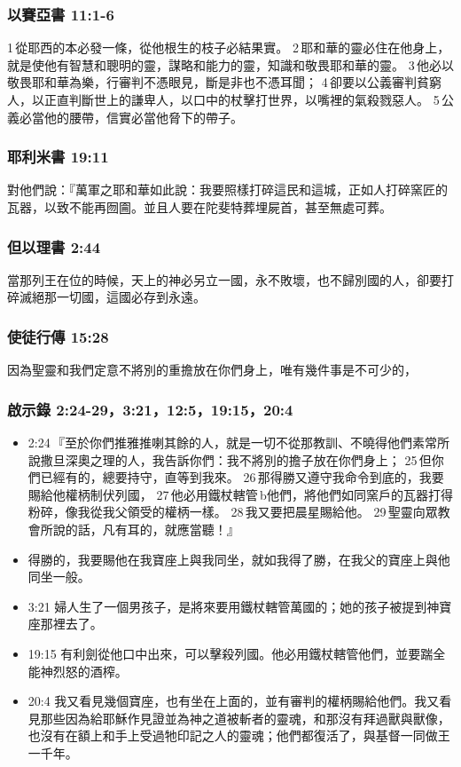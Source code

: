 \subsubsection{以賽亞書 11:1-6}
1 從耶西的本必發一條，從他根生的枝子必結果實。 2 耶和華的靈必住在他身上，就是使他有智慧和聰明的靈，謀略和能力的靈，知識和敬畏耶和華的靈。 3 他必以敬畏耶和華為樂，行審判不憑眼見，斷是非也不憑耳聞； 4 卻要以公義審判貧窮人，以正直判斷世上的謙卑人，以口中的杖擊打世界，以嘴裡的氣殺戮惡人。 5 公義必當他的腰帶，信實必當他脅下的帶子。

\subsubsection{耶利米書 19:11}
對他們說：『萬軍之耶和華如此說：我要照樣打碎這民和這城，正如人打碎窯匠的瓦器，以致不能再囫圇。並且人要在陀斐特葬埋屍首，甚至無處可葬。

\subsubsection{但以理書 2:44}
當那列王在位的時候，天上的神必另立一國，永不敗壞，也不歸別國的人，卻要打碎滅絕那一切國，這國必存到永遠。

\subsubsection{使徒行傳 15:28}
因為聖靈和我們定意不將別的重擔放在你們身上，唯有幾件事是不可少的，

\subsubsection{啟示錄 2:24-29，3:21，12:5，19:15，20:4 }
\begin{itemize} 
\itemsep-.25em
\item 2:24 『至於你們推雅推喇其餘的人，就是一切不從那教訓、不曉得他們素常所說撒旦深奧之理的人，我告訴你們：我不將別的擔子放在你們身上； 25 但你們已經有的，總要持守，直等到我來。 26 那得勝又遵守我命令到底的，我要賜給他權柄制伏列國， 27 他必用鐵杖轄管 b他們，將他們如同窯戶的瓦器打得粉碎，像我從我父領受的權柄一樣。 28 我又要把晨星賜給他。 29 聖靈向眾教會所說的話，凡有耳的，就應當聽！』
\item 得勝的，我要賜他在我寶座上與我同坐，就如我得了勝，在我父的寶座上與他同坐一般。
\item 3:21 婦人生了一個男孩子，是將來要用鐵杖轄管萬國的；她的孩子被提到神寶座那裡去了。
\item 19:15 有利劍從他口中出來，可以擊殺列國。他必用鐵杖轄管他們，並要踹全能神烈怒的酒榨。
\item 20:4 我又看見幾個寶座，也有坐在上面的，並有審判的權柄賜給他們。我又看見那些因為給耶穌作見證並為神之道被斬者的靈魂，和那沒有拜過獸與獸像，也沒有在額上和手上受過牠印記之人的靈魂；他們都復活了，與基督一同做王一千年。
\end{itemize} 









